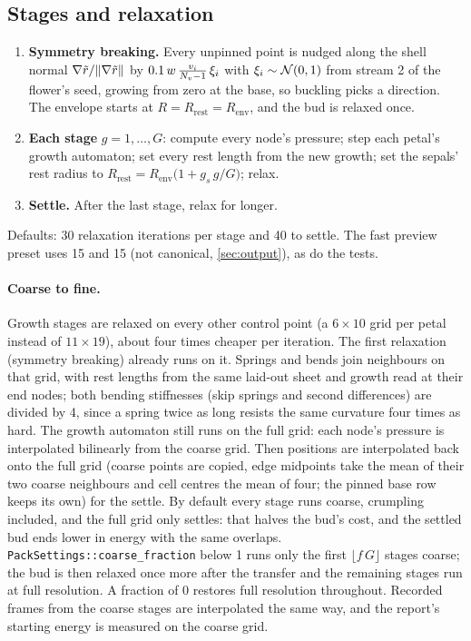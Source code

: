 \subsection{Stages and relaxation}\label{sec:stages}
\begin{enumerate}[leftmargin=*]
\item \textbf{Symmetry breaking.} Every unpinned point is nudged along the
  shell normal $\nabla\tilde r/\lVert\nabla\tilde r\rVert$ by
  $0.1\,w\,\tfrac{v_i}{N_v - 1}\,\xi_i$ with $\xi_i\sim\mathcal{N}(0,1)$ from stream 2
  of the flower's seed, growing from zero at the base, so buckling picks a
  direction. The envelope starts at $R = R_{\mathrm{rest}} = R_{\mathrm{env}}$,
  and the bud is relaxed once.
\item \textbf{Each stage} $g = 1,\dots,G$: compute every node's pressure; step
  each petal's growth automaton; set every rest length from the new growth;
  set the sepals' rest radius to
  $R_{\mathrm{rest}} = R_{\mathrm{env}}\bigl(1 + g_s\,g/G\bigr)$; relax.
\item \textbf{Settle.} After the last stage, relax for longer.
\end{enumerate}
Defaults: 30 relaxation iterations per stage and 40 to settle. The fast
preview preset uses 15 and 15 (not canonical, \cref{sec:output}), as do the
tests.

\paragraph{Coarse to fine.} Growth stages are relaxed on every other control point (a
$6\times10$ grid per petal instead of $11\times19$), about four times cheaper per
iteration. The first relaxation (symmetry breaking) already runs on it.
Springs and bends join neighbours on that grid, with rest lengths from the same
laid-out sheet and growth read at their end nodes; both bending stiffnesses
(skip springs and second differences) are divided by 4, since a spring twice as long resists the
same curvature four times as hard. The growth automaton still runs on the full
grid: each node's pressure is interpolated bilinearly from the coarse grid.
Then positions are interpolated back onto the full grid (coarse points are
copied, edge midpoints take the mean of their two coarse neighbours and cell
centres the mean of four; the pinned base row keeps its own) for the settle.
By default every stage runs coarse, crumpling included, and the full grid only
settles: that halves the bud's cost, and the settled bud ends lower in energy
with the same overlaps. \texttt{PackSettings::coarse\_fraction} below 1 runs
only the first $\lfloor f\,G\rfloor$ stages coarse; the bud is then relaxed
once more after the transfer and the remaining stages run at full resolution.
A fraction of 0 restores full resolution throughout. Recorded
frames from the coarse stages are interpolated the same way, and the report's
starting energy is measured on the coarse grid.

